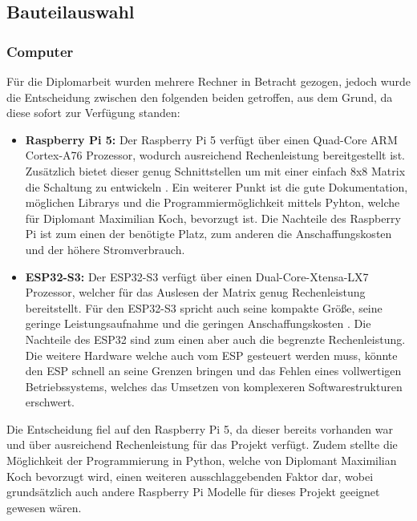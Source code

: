 \renewcommand{\myauthor}{Christoph Schwaninger}
\subsection{Bauteilauswahl}

\subsubsection{Computer}

Für die Diplomarbeit wurden mehrere Rechner in Betracht gezogen, jedoch wurde die Entscheidung zwischen den folgenden beiden getroffen, aus dem Grund, da diese sofort zur Verfügung standen:
\begin{itemize}
\item \textbf{Raspberry Pi 5:} Der Raspberry Pi 5 verfügt über einen Quad-Core ARM Cortex-A76 Prozessor, wodurch ausreichend Rechenleistung bereitgestellt ist. Zusätzlich bietet dieser genug Schnittstellen um mit einer einfach 8x8 Matrix die Schaltung zu entwickeln \cite{raspi5_brief}. Ein weiterer Punkt ist die gute Dokumentation, möglichen Librarys und die Programmiermöglichkeit mittels Pyhton, welche für Diplomant Maximilian Koch, bevorzugt ist.
Die Nachteile des Raspberry Pi ist zum einen der benötigte Platz, zum anderen die Anschaffungskosten und der höhere Stromverbrauch.\\

\item \textbf{ESP32-S3:} Der ESP32-S3 verfügt über einen Dual-Core-Xtensa-LX7 Prozessor, welcher für das Auslesen der Matrix genug Rechenleistung bereitstellt. Für den ESP32-S3 spricht auch seine kompakte Größe, seine geringe Leistungsaufnahme und die geringen Anschaffungskosten \cite{espressif_esp32s3}.
Die Nachteile des ESP32 sind zum einen aber auch die begrenzte Rechenleistung. Die weitere Hardware welche auch vom ESP gesteuert werden muss, könnte den ESP schnell an seine Grenzen bringen und das Fehlen eines vollwertigen Betriebssystems, welches das Umsetzen von komplexeren Softwarestrukturen erschwert. 
\end{itemize}

Die Entscheidung fiel auf den Raspberry Pi 5, da dieser bereits vorhanden war und über ausreichend Rechenleistung für das Projekt verfügt. Zudem stellte die Möglichkeit der Programmierung in Python, welche von Diplomant Maximilian Koch bevorzugt wird, einen weiteren ausschlaggebenden Faktor dar, wobei grundsätzlich auch andere Raspberry Pi Modelle für dieses Projekt geeignet gewesen wären.


